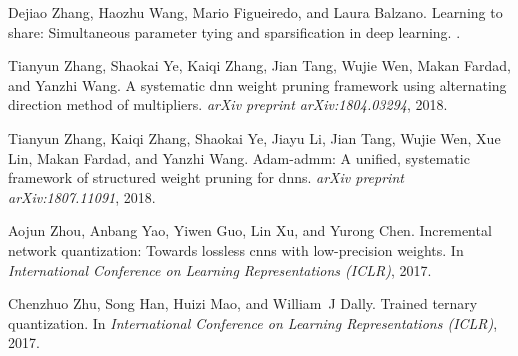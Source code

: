 \documentclass{article} %
\begin{document}
\begin{thebibliography}{36}
Dejiao Zhang, Haozhu Wang, Mario Figueiredo, and Laura Balzano.
\newblock Learning to share: Simultaneous parameter tying and sparsification in
  deep learning.
.

Tianyun Zhang, Shaokai Ye, Kaiqi Zhang, Jian Tang, Wujie Wen, Makan Fardad, and
  Yanzhi Wang.
\newblock A systematic dnn weight pruning framework using alternating direction
  method of multipliers.
\newblock \emph{arXiv preprint arXiv:1804.03294}, 2018{}.

Tianyun Zhang, Kaiqi Zhang, Shaokai Ye, Jiayu Li, Jian Tang, Wujie Wen, Xue
  Lin, Makan Fardad, and Yanzhi Wang.
\newblock Adam-admm: A unified, systematic framework of structured weight
  pruning for dnns.
\newblock \emph{arXiv preprint arXiv:1807.11091}, 2018{}.

Aojun Zhou, Anbang Yao, Yiwen Guo, Lin Xu, and Yurong Chen.
\newblock Incremental network quantization: Towards lossless cnns with
  low-precision weights.
\newblock In \emph{International Conference on Learning Representations
  (ICLR)}, 2017.

Chenzhuo Zhu, Song Han, Huizi Mao, and William~J Dally.
\newblock Trained ternary quantization.
\newblock In \emph{International Conference on Learning Representations
  (ICLR)}, 2017.

\end{thebibliography}
\end{document}

